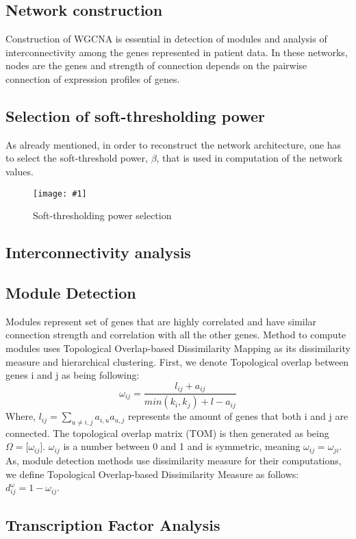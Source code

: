 \documentclass{ba-kecs}
\numberwithin{figure}{section}
\numberwithin{equation}{section}
\newcommand{\dkepic}[2]{ %
	\begin{figure}[H] %
	\texttt{[image: \#1]}
	\caption{#2}
	\label{#1}
	\end{figure}
}
\begin{document}
\subsection{Network construction}
Construction of WGCNA is essential in detection of modules and analysis of interconnectivity among the genes represented in patient data. In these networks, nodes are the genes and strength of connection depends on the pairwise connection of expression profiles of genes.
\subsection{Selection of soft-thresholding power}
As already mentioned, in order to reconstruct the network architecture, one has to select the soft-threshold power, $\beta$, that is used in computation of the network values\cite{wgcna3}.
\dkepic{power}{Soft-thresholding power selection}
\subsection{Interconnectivity analysis}


\subsection{Module Detection}
Modules represent set of genes that are highly correlated and have similar connection strength and correlation with all the other genes. Method to compute modules uses Topological Overlap-based Dissimilarity Mapping as its dissimilarity measure and hierarchical clustering. First, we denote Topological overlap between genes i and j as being following:\\
\begin{equation}
\omega _{ij} = \dfrac{l _{ij} + a_{ij}}{min(k_i,k_j) + l - a_{ij}}
\end{equation}
Where, $l_{ij} = \sum_{u \neq {i,j}} a_{i,u} a_{u,j}$ represents the amount of genes that both i and j are connected. The topological overlap matrix (TOM) is then generated as being $\Omega = \lbrack \omega _{ij} \rbrack$. $\omega _{ij}$ is a number between 0 and 1 and is symmetric, meaning $\omega _{ij} = \omega _{ji}$. As, module detection methods use dissimilarity measure for their computations, we define Topological Overlap-based Dissimilarity Measure as follows: $d _{ij} ^{\omega} = 1 - \omega _{ij}$.

\subsection{Transcription Factor Analysis}
\end{document}
